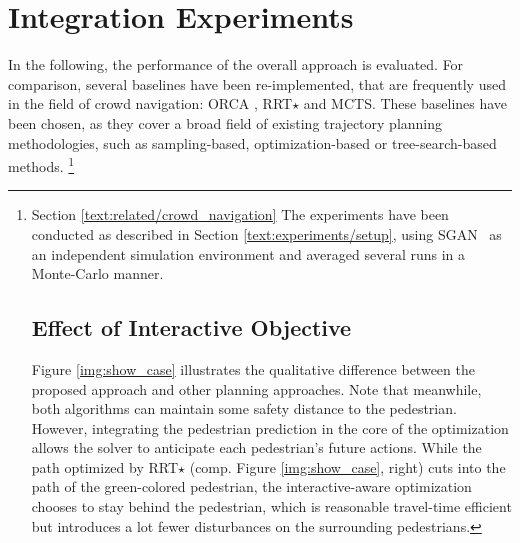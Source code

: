 \section{Integration Experiments}
\label{text:experiments/integration}
In the following, the performance of the overall approach is evaluated. For comparison, several baselines have been re-implemented, that are frequently used in the field of crowd navigation: \ac{ORCA} \cite{vandenBerg2011}, \ac{RRT}$\star$ \cite{Karaman2011} and \ac{MCTS}. These baselines have been chosen, as they cover a broad field of existing trajectory planning methodologies, such as sampling-based, optimization-based or tree-search-based methods. \footnote{Section \ref{text:related/crowd_navigation} The experiments have been conducted as described in Section \ref{text:experiments/setup}, using \ac{SGAN} \cite{Gupta2018} as an independent simulation environment and averaged several runs in a Monte-Carlo manner.

\subsection{Effect of Interactive Objective}
Figure \ref{img:show_case} illustrates the qualitative difference between the proposed approach and other planning approaches. Note that meanwhile, both algorithms can maintain some safety distance to the pedestrian. However, integrating the pedestrian prediction in the core of the optimization allows the solver to anticipate each pedestrian's future actions. While the path optimized by \ac{RRT}$\star$ (comp. Figure \ref{img:show_case}, right) cuts into the path of the green-colored pedestrian, the interactive-aware optimization chooses to stay behind the pedestrian, which is reasonable travel-time efficient but introduces a lot fewer disturbances on the surrounding pedestrians. 

}
